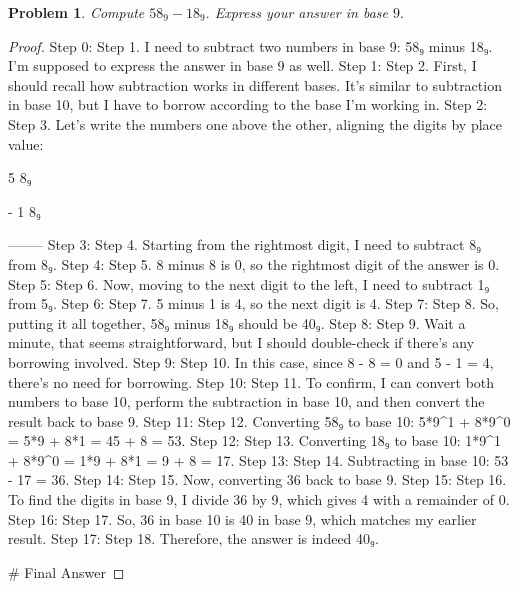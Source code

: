 \documentclass{article}
\newtheorem{theorem}{Problem}
\begin{document}
\begin{theorem}
Compute $58_9 - 18_9.$ Express your answer in base $9.$
\end{theorem}

\begin{proof}
Step 0: Step 1. I need to subtract two numbers in base 9: 58₉ minus 18₉. I'm supposed to express the answer in base 9 as well.
Step 1: Step 2. First, I should recall how subtraction works in different bases. It's similar to subtraction in base 10, but I have to borrow according to the base I'm working in.
Step 2: Step 3. Let's write the numbers one above the other, aligning the digits by place value:

                 5 8₉

               - 1 8₉

               --------
Step 3: Step 4. Starting from the rightmost digit, I need to subtract 8₉ from 8₉.
Step 4: Step 5. 8 minus 8 is 0, so the rightmost digit of the answer is 0.
Step 5: Step 6. Now, moving to the next digit to the left, I need to subtract 1₉ from 5₉.
Step 6: Step 7. 5 minus 1 is 4, so the next digit is 4.
Step 7: Step 8. So, putting it all together, 58₉ minus 18₉ should be 40₉.
Step 8: Step 9. Wait a minute, that seems straightforward, but I should double-check if there's any borrowing involved.
Step 9: Step 10. In this case, since 8 - 8 = 0 and 5 - 1 = 4, there's no need for borrowing.
Step 10: Step 11. To confirm, I can convert both numbers to base 10, perform the subtraction in base 10, and then convert the result back to base 9.
Step 11: Step 12. Converting 58₉ to base 10: 5*9^1 + 8*9^0 = 5*9 + 8*1 = 45 + 8 = 53.
Step 12: Step 13. Converting 18₉ to base 10: 1*9^1 + 8*9^0 = 1*9 + 8*1 = 9 + 8 = 17.
Step 13: Step 14. Subtracting in base 10: 53 - 17 = 36.
Step 14: Step 15. Now, converting 36 back to base 9.
Step 15: Step 16. To find the digits in base 9, I divide 36 by 9, which gives 4 with a remainder of 0.
Step 16: Step 17. So, 36 in base 10 is 40 in base 9, which matches my earlier result.
Step 17: Step 18. Therefore, the answer is indeed 40₉.

        # Final Answer

\end{proof}
\end{document}
